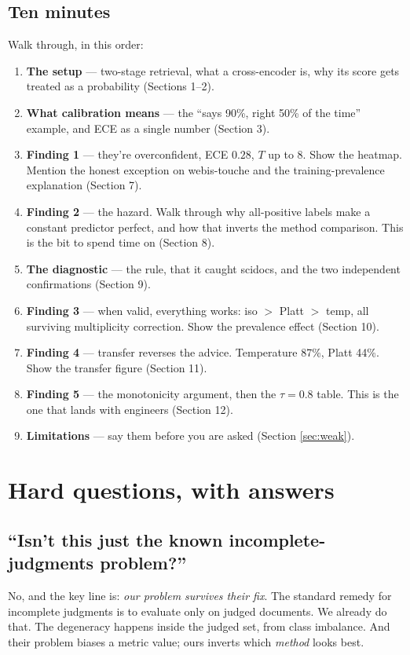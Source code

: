 \documentclass[11pt,a4paper]{article}
\begin{document}
\subsection{Ten minutes}
Walk through, in this order:
\begin{enumerate}[leftmargin=*]
  \item \textbf{The setup} --- two-stage retrieval, what a cross-encoder is, why its
  score gets treated as a probability (Sections 1--2).
  \item \textbf{What calibration means} --- the ``says 90\%, right 50\% of the time''
  example, and ECE as a single number (Section 3).
  \item \textbf{Finding 1} --- they're overconfident, ECE $0.28$, $T$ up to 8. Show
  the heatmap. Mention the honest exception on webis-touche and the
  training-prevalence explanation (Section 7).
  \item \textbf{Finding 2} --- the hazard. Walk through why all-positive labels make a
  constant predictor perfect, and how that inverts the method comparison. This is the
  bit to spend time on (Section 8).
  \item \textbf{The diagnostic} --- the rule, that it caught scidocs, and the two
  independent confirmations (Section 9).
  \item \textbf{Finding 3} --- when valid, everything works: iso $>$ Platt $>$ temp,
  all surviving multiplicity correction. Show the prevalence effect (Section 10).
  \item \textbf{Finding 4} --- transfer reverses the advice. Temperature 87\%, Platt
  44\%. Show the transfer figure (Section 11).
  \item \textbf{Finding 5} --- the monotonicity argument, then the $\tau = 0.8$ table.
  This is the one that lands with engineers (Section 12).
  \item \textbf{Limitations} --- say them before you are asked (Section
  \ref{sec:weak}).
\end{enumerate}

\section{Hard questions, with answers}

\subsection*{``Isn't this just the known incomplete-judgments problem?''}
No, and the key line is: \emph{our problem survives their fix}. The standard remedy
for incomplete judgments is to evaluate only on judged documents. We already do that.
The degeneracy happens inside the judged set, from class imbalance. And their problem
biases a metric value; ours inverts which \emph{method} looks best.
\end{document}
